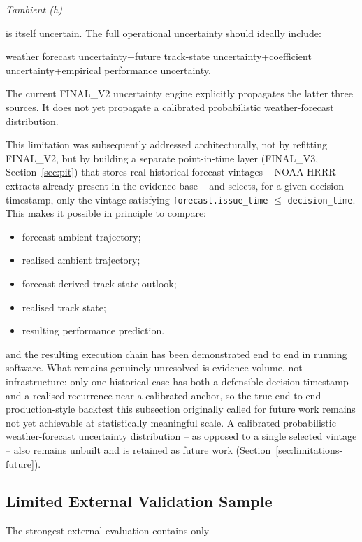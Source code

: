 \begin{center}\textit{Tambient (h)}\end{center}

is itself uncertain. The full operational uncertainty should ideally include:

weather forecast uncertainty+future track-state uncertainty+coefficient uncertainty+empirical performance uncertainty.

The current FINAL\_V2 uncertainty engine explicitly propagates the latter three sources. It does not yet propagate a calibrated probabilistic weather-forecast distribution.

This limitation was subsequently addressed architecturally, not by refitting FINAL\_V2, but by building a separate point-in-time layer (FINAL\_V3, Section~\ref{sec:pit}) that stores real historical forecast vintages -- NOAA HRRR extracts already present in the evidence base -- and selects, for a given decision timestamp, only the vintage satisfying \texttt{forecast.issue\_time} $\le$ \texttt{decision\_time}. This makes it possible in principle to compare:

\begin{itemize}
\item forecast ambient trajectory;
\item realised ambient trajectory;
\item forecast-derived track-state outlook;
\item realised track state;
\item resulting performance prediction.
\end{itemize}

and the resulting execution chain has been demonstrated end to end in running software. What remains genuinely unresolved is evidence volume, not infrastructure: only one historical case has both a defensible decision timestamp and a realised recurrence near a calibrated anchor, so the true end-to-end production-style backtest this subsection originally called for future work remains not yet achievable at statistically meaningful scale. A calibrated probabilistic weather-forecast uncertainty distribution -- as opposed to a single selected vintage -- also remains unbuilt and is retained as future work (Section~\ref{sec:limitations-future}).
\subsection{Limited External Validation Sample}
The strongest external evaluation contains only


